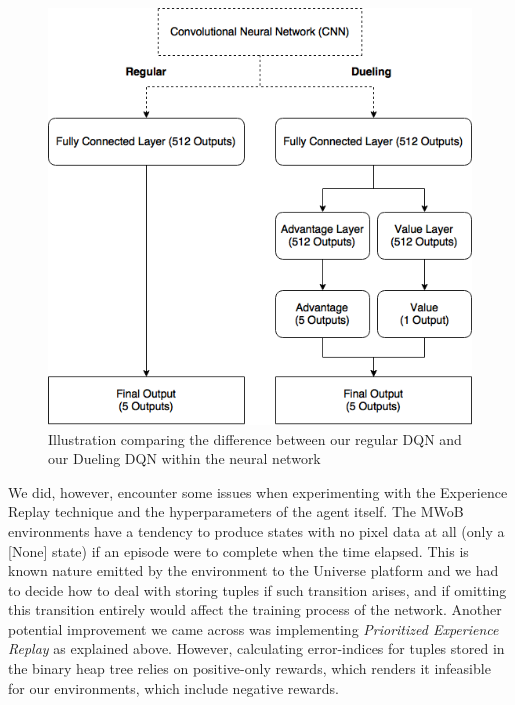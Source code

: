 \documentclass[10pt,journal,compsoc]{IEEEtran}
\begin{document}
\begin{figure}[t]
\centering
	\includegraphics[width=\columnwidth, keepaspectratio]{dueling.png}
	\caption{Illustration comparing the difference between our regular DQN and our Dueling DQN within the neural network}
	\label{fig:dueling}
\end{figure}

We did, however, encounter some issues when experimenting with the Experience Replay technique and the hyperparameters of the agent itself. The MWoB environments have a tendency to produce states with no pixel data at all (only a [None] state) if an episode were to complete when the time elapsed. This is known nature emitted by the environment to the Universe platform and we had to decide how to deal with storing tuples if such transition arises, and if omitting this transition entirely would affect the training process of the network. Another potential improvement we came across was implementing \textit{Prioritized Experience Replay} as explained above. However, calculating error-indices for tuples stored in the binary heap tree relies on positive-only rewards, which renders it infeasible for our environments, which include negative rewards. \\
\end{document}
